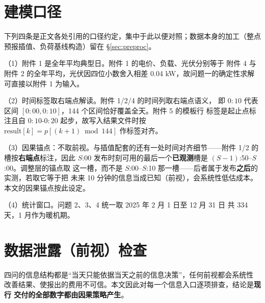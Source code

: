 \documentclass[withoutpreface]{cumcmthesis}
\renewcommand{\emph}[1]{\textbf{#1}}
\begin{document}
\newpage
\begin{appendices}
\section{建模口径}
\label{app:caliber}

\noindent 下列四条是正文各处引用的口径约定，集中于此以便对照；数据本身的加工（整点预报插值、负荷基线构造）留在 \S\ref{sec:preproc}。

\noindent（1）附件 1 是全年平均典型日。附件 1 的电价、负载、光伏分别等于
附件 4 与附件 2 的全年平均，光伏因四位小数舍入相差 0.04 kW，故问题一的确定性求解
可直接以附件 1 为输入。


\noindent（2）时间标签取右端点解读。附件 1/2/4 的时间列取右端点语义，
即 $0{:}10$ 代表区间 $[0{:}00,0{:}10]$，144 个区间恰好覆盖全天。附件 5 的模板行
标签是起止点标注且自 $0{:}10$-$0{:}20$ 起步，故写入结果文件时按
$\text{result}[k]=p[(k+1)\bmod 144]$ 作标签对齐。


\noindent（3）因果锚点：不取前视。与插值配套的还有一处时间对齐细节——附件 1/2 的槽按\emph{右端点}标注，因此
$S$:00 发布时刻可用的最后一个\emph{已观测}槽是 $(S{-}1)$:50--$S$:00。调整层的锚点取
这一槽，而不是 $S$:00--$S$:10 那一槽——后者属于发布\emph{之后}的实测，若取它等于把
未来 10 分钟的信息当成已知（前视），会系统性低估成本。本文的因果锚点按此设定。


\noindent（4）统计窗口。问题 2、3、4 统一取 2025 年 2 月 1 日至 12 月 31 日
共 334 天，1 月作为暖机期。


\section{数据泄露（前视）检查}
\label{app:leak}

\noindent 四问的信息结构都是“当天只能依据当天之前的信息决策”，任何前视都会系统性
改善结果、使报出的费用不可信。本文因此对每一个信息入口逐项排查，结论是\textbf{现行
交付的全部数字都由因果策略产生}。


\end{appendices}
\end{document}
